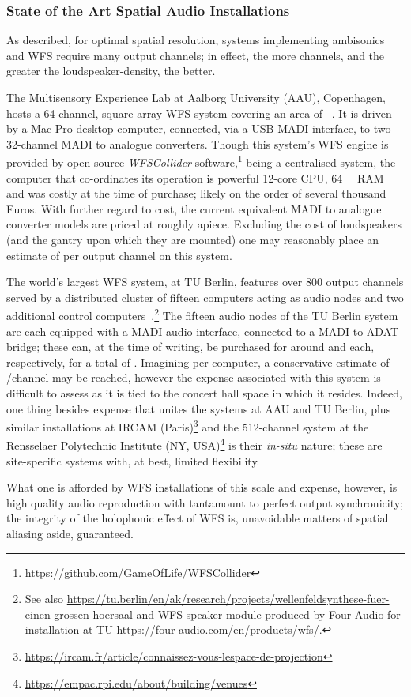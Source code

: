 \subsubsection{State of the Art Spatial Audio Installations}
\label{subsubsec:spatial-sota}

As described, for optimal spatial resolution, systems implementing ambisonics
and WFS require many output channels; in effect, the more channels, and the
greater the loudspeaker-density, the better.

The Multisensory Experience Lab at Aalborg University (AAU), Copenhagen, hosts
a 64-channel, square-array WFS system covering an area of
~\citep{grani_gestural_2016}.
It is driven by a Mac Pro desktop computer, connected, via a USB MADI interface,
to two 32-channel MADI to analogue converters.
Though this system's WFS engine is provided by open-source \textit{WFSCollider}
software,\footnote{\url{https://github.com/GameOfLife/WFSCollider}} being a
centralised system, the computer that co-ordinates its operation is powerful
\textemdash{} 12-core CPU, \qty{64}{\giga\byte} RAM \textemdash{} and was costly
at the time of purchase; likely on the order of several thousand Euros.
With further regard to cost, the current equivalent MADI to analogue converter
models are priced at roughly  apiece.
Excluding the cost of loudspeakers (and the gantry upon which they are mounted)
one may reasonably place an estimate of  per output channel on
this system.

The world's largest WFS system, at TU Berlin, features over 800 output channels
served by a distributed cluster of fifteen computers acting as audio nodes and
two additional control computers~\citep{baalman_renewed_2007}.\footnote{
    See also
    \url{https://tu.berlin/en/ak/research/projects/wellenfeldsynthese-fuer-einen-grossen-hoersaal}
    and WFS speaker module produced by Four Audio for installation at TU
    \url{https://four-audio.com/en/products/wfs/}.
}
The fifteen audio nodes of the TU Berlin system are each equipped with a MADI
audio interface, connected to a MADI to ADAT bridge;
these can, at the time of writing, be purchased for around 
and  each, respectively, for a total of
.
Imagining  per computer, a conservative estimate of
/channel may be reached, however the expense associated with this
system is difficult to assess as it is tied to the concert hall space in which
it resides.
Indeed, one thing besides expense that unites the systems at AAU and TU Berlin,
plus similar installations at IRCAM (Paris)\footnote{
    \url{https://ircam.fr/article/connaissez-vous-lespace-de-projection}
} and the 512-channel system at the Rensselaer Polytechnic Institute
(NY, USA)\footnote{
    \url{https://empac.rpi.edu/about/building/venues}
} is their \textit{in-situ} nature;
these are site-specific systems with, at best, limited flexibility.

What one is afforded by WFS installations of this scale and expense, however, is
high quality audio reproduction with tantamount to perfect output synchronicity;
the integrity of the holophonic effect of WFS is, unavoidable matters of spatial
aliasing aside, guaranteed.
